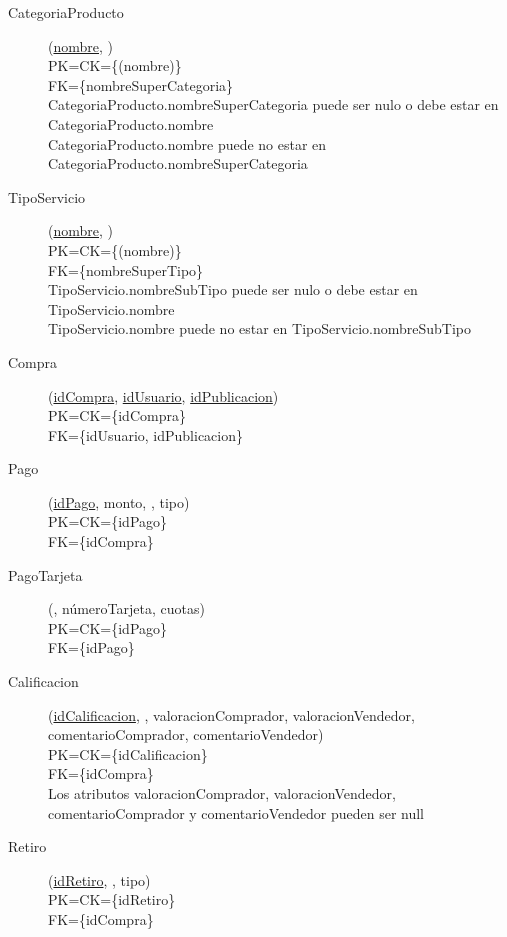 \begin{description}
 \item[CategoriaProducto](\underline{nombre}, )\\
PK=CK=\{(nombre)\}\\
FK=\{nombreSuperCategoria\}\\
CategoriaProducto.nombreSuperCategoria puede ser nulo o debe estar en CategoriaProducto.nombre\\
CategoriaProducto.nombre puede no estar en CategoriaProducto.nombreSuperCategoria

 \item[TipoServicio](\underline{nombre}, )\\
PK=CK=\{(nombre)\}\\
FK=\{nombreSuperTipo\}\\
TipoServicio.nombreSubTipo puede ser nulo o debe estar en TipoServicio.nombre\\
TipoServicio.nombre puede no estar en TipoServicio.nombreSubTipo


 \item[Compra](\underline{idCompra}, \underline{idUsuario}, \underline{idPublicacion})\\
PK=CK=\{idCompra\}\\
FK=\{idUsuario, idPublicacion\}\\

 \item[Pago](\underline{idPago}, monto, , tipo)\\
PK=CK=\{idPago\}\\
FK=\{idCompra\}\\

 \item[PagoTarjeta](\underline{}, númeroTarjeta, cuotas)\\
PK=CK=\{idPago\}\\
FK=\{idPago\}\\

 \item[Calificacion](\underline{idCalificacion}, , valoracionComprador, valoracionVendedor, comentarioComprador, comentarioVendedor)\\
PK=CK=\{idCalificacion\}\\
FK=\{idCompra\}\\
Los atributos valoracionComprador, valoracionVendedor, comentarioComprador y comentarioVendedor pueden ser null

 \item[Retiro](\underline{idRetiro}, , tipo)\\
PK=CK=\{idRetiro\}\\
FK=\{idCompra\}\\


\end{description}
